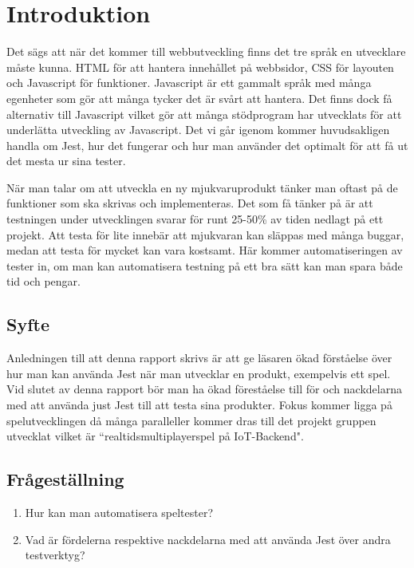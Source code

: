 \section{Introduktion}
\label{sec:david-introduction}

Det sägs att när det kommer till webbutveckling finns det tre språk en utvecklare måste kunna. HTML för att hantera innehållet på webbsidor, CSS för layouten och Javascript för funktioner. Javascript är ett gammalt språk med många egenheter som gör att många tycker det är svårt att hantera. Det finns dock få alternativ till Javascript vilket gör att många stödprogram har utvecklats för att underlätta utveckling av Javascript. Det vi går igenom kommer huvudsakligen handla om Jest\cite{bib-jest}, hur det fungerar och hur man använder det optimalt för att få ut det mesta ur sina tester.

När man talar om att utveckla en ny mjukvaruprodukt tänker man oftast på de funktioner som ska skrivas och implementeras. Det som få tänker på är att testningen under utvecklingen svarar för runt 25-50\% av tiden nedlagt på ett projekt. Att testa för lite innebär att mjukvaran kan släppas med många buggar, medan att testa för mycket kan vara kostsamt. Här kommer automatiseringen av tester in, om man kan automatisera testning på ett bra sätt kan man spara både tid och pengar.

\subsection{Syfte}
Anledningen till att denna rapport skrivs är att ge läsaren ökad förståelse över hur man kan använda Jest när man utvecklar en produkt, exempelvis ett spel. Vid slutet av denna rapport bör man ha ökad föreståelse till för och nackdelarna med att använda just Jest till att testa sina produkter. Fokus kommer ligga på spelutvecklingen då många paralleller kommer dras till det projekt gruppen utvecklat vilket är ``realtidsmultiplayerspel på IoT-Backend". 




\subsection{Frågeställning}
\label{subsec:david-research-questions}

\begin{enumerate}
\item Hur kan man automatisera speltester?
\item Vad är fördelerna respektive nackdelarna med att använda Jest över andra testverktyg?

\end{enumerate}


